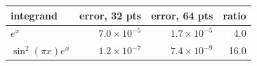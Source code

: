 \begin{tabular}{lrrr}
\toprule
integrand & error, 32 pts & error, 64 pts & ratio \\
\midrule
$e^x$ & $7.0\times10^{-5}$ & $1.7\times10^{-5}$ & 4.0 \\
$\sin^2(\pi x)e^x$ & $1.2\times10^{-7}$ & $7.4\times10^{-9}$ & 16.0 \\
\bottomrule
\end{tabular}
